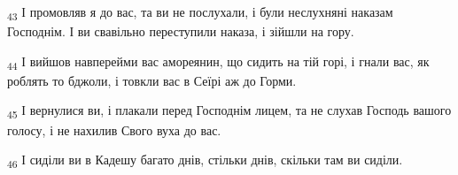 \begin{tcolorbox}
\textsubscript{43} І промовляв я до вас, та ви не послухали, і були неслухняні наказам Господнім. І ви свавільно переступили наказа, і зійшли на гору.
\end{tcolorbox}
\begin{tcolorbox}
\textsubscript{44} І вийшов навперейми вас амореянин, що сидить на тій горі, і гнали вас, як роблять то бджоли, і товкли вас в Сеїрі аж до Горми.
\end{tcolorbox}
\begin{tcolorbox}
\textsubscript{45} І вернулися ви, і плакали перед Господнім лицем, та не слухав Господь вашого голосу, і не нахилив Свого вуха до вас.
\end{tcolorbox}
\begin{tcolorbox}
\textsubscript{46} І сиділи ви в Кадешу багато днів, стільки днів, скільки там ви сиділи.
\end{tcolorbox}
